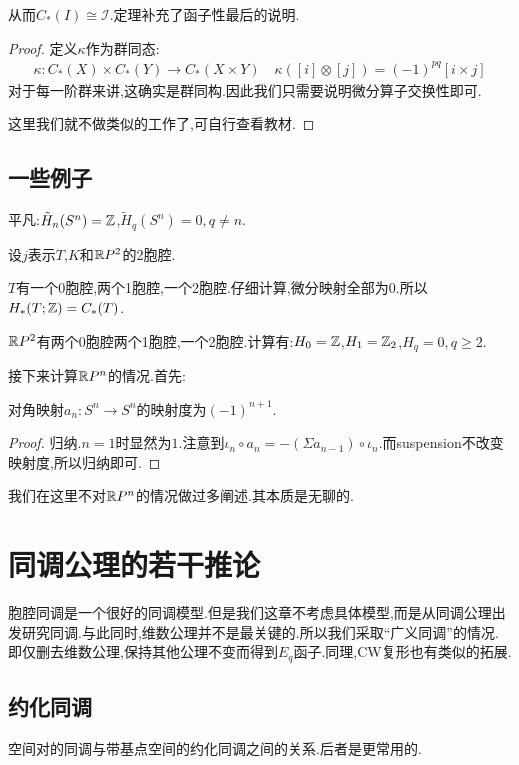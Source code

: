 从而$C_*(I) \cong \mathscr{I}$.定理补充了函子性最后的说明.
\begin{proof}
    定义$\kappa$作为群同态:
    \begin{align*}
        \kappa:C_*(X)\times C_*(Y) \to C_*(X \times Y) \quad \kappa([i]\otimes [j])=(-1)^{pq}[i \times j]
    \end{align*}
    对于每一阶群来讲,这确实是群同构.因此我们只需要说明微分算子交换性即可.

    这里我们就不做类似的工作了,可自行查看教材.
\end{proof}
\section{一些例子}
\begin{example}[$S^n$]
    平凡:$\tilde{H}_n(S^n)=\mathbb{Z}$,$\tilde{H}_q(S^n)=0,q \neq n$.
\end{example}
设$j$表示$T$,$K$和$\R P^2$的2胞腔.
\begin{example}[$T$]
    $T$有一个0胞腔,两个1胞腔,一个2胞腔.仔细计算,微分映射全部为$0$.所以$H_*(T;\mathbb{Z})=C_*(T)$.
\end{example}
\begin{example}[$\R P^2$]
    $\R P^2$有两个0胞腔两个1胞腔,一个2胞腔.计算有:$H_0=\mathbb{Z}$,$H_1=\mathbb{Z}_2$,$H_q=0,q \geq 2$.
\end{example}

接下来计算$\mathbb{R} P^n$的情况.首先:
\begin{lemma}
    对角映射$a_n:S^n \to S^n$的映射度为$(-1)^{n+1}$.
\end{lemma}
\begin{proof}
    归纳.$n=1$时显然为$1$.注意到$\iota_n \circ a_n=-(\Sigma a_{n-1})\circ \iota_n$.而suspension不改变映射度,所以归纳即可.
\end{proof}
我们在这里不对$\mathbb{R} P^n$的情况做过多阐述.其本质是无聊的.
\chapter{同调公理的若干推论}
胞腔同调是一个很好的同调模型.但是我们这章不考虑具体模型,而是从同调公理出发研究同调.与此同时,维数公理并不是最关键的.所以我们采取“广义同调”的情况.即仅删去维数公理,保持其他公理不变而得到$E_q$函子.同理,CW复形也有类似的拓展.

\section{约化同调}
空间对的同调与带基点空间的约化同调之间的关系.后者是更常用的.

